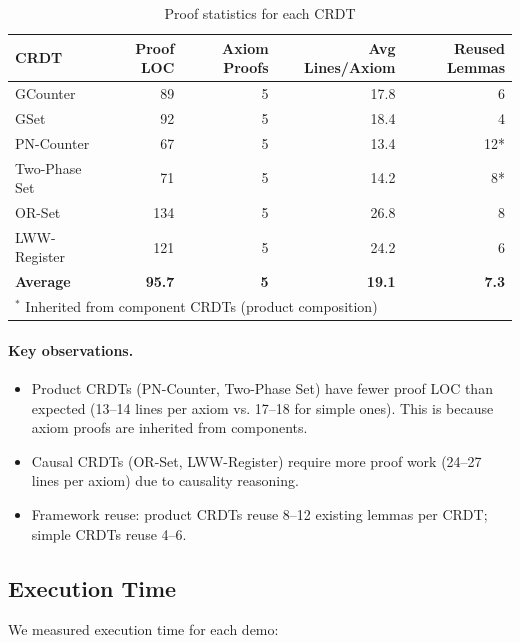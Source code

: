 \begin{table}[t]
  \centering
  \caption{Proof statistics for each CRDT}
  \label{tab:proof-stats}
  \small
  \begin{tabular}{lrrrr}
    \toprule
    \textbf{CRDT} & \textbf{Proof LOC} & \textbf{Axiom Proofs} & \textbf{Avg Lines/Axiom} & \textbf{Reused Lemmas}\\
    \midrule
    GCounter & 89 & 5 & 17.8 & 6\\
    GSet & 92 & 5 & 18.4 & 4\\
    PN-Counter & 67 & 5 & 13.4 & 12*\\
    Two-Phase Set & 71 & 5 & 14.2 & 8*\\
    OR-Set & 134 & 5 & 26.8 & 8\\
    LWW-Register & 121 & 5 & 24.2 & 6\\
    \midrule
    \textbf{Average} & \textbf{95.7} & \textbf{5} & \textbf{19.1} & \textbf{7.3}\\
    \bottomrule
    \multicolumn{5}{l}{\small $^*$ Inherited from component CRDTs (product composition)}
  \end{tabular}
\end{table}

\paragraph{Key observations.}
\begin{itemize}
  \item Product CRDTs (PN-Counter, Two-Phase Set) have fewer proof LOC than expected (13--14 lines per axiom vs. 17--18 for simple ones). This is because axiom proofs are inherited from components.
  \item Causal CRDTs (OR-Set, LWW-Register) require more proof work (24--27 lines per axiom) due to causality reasoning.
  \item Framework reuse: product CRDTs reuse 8--12 existing lemmas per CRDT; simple CRDTs reuse 4--6.
\end{itemize}

\subsection{Execution Time}

We measured execution time for each demo:

